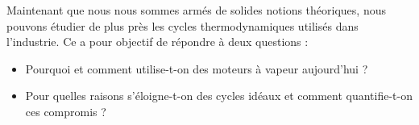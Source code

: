Maintenant que nous nous sommes armés de solides notions théoriques, nous pouvons étudier de plus près les cycles thermodynamiques utilisés dans l’industrie. Ce \coursneuf a pour objectif de répondre à deux questions :
\begin{itemize}
	\item Pourquoi et comment utilise-t-on des moteurs à vapeur aujourd’hui ?
	\item Pour quelles raisons s’éloigne-t-on des cycles idéaux et comment quantifie-t-on ces compromis ?
\end{itemize}
